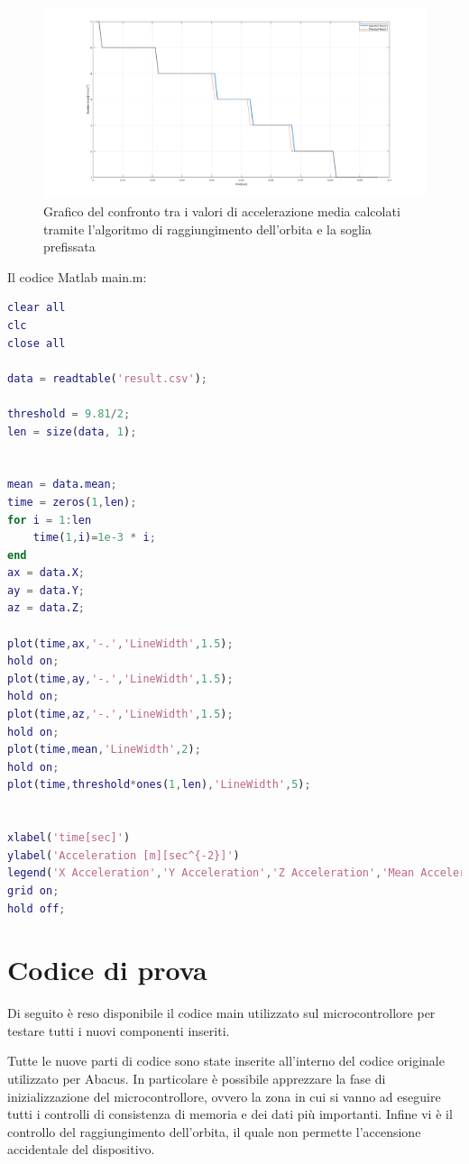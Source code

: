 \documentclass[LaM,binding=0.6cm]{../sapthesis}
\begin{document}
\begin{itemize}
    \begin{figure}[htbp]
    \centerline{\includegraphics[scale=0.4]{examples/CompareAlgorithResult.png}}
    \caption{Grafico del confronto tra i valori di accelerazione media calcolati tramite l'algoritmo di raggiungimento dell'orbita e la soglia prefissata}
    \label{fig}
    \end{figure}
\end{itemize}


\newpage
Il codice Matlab main.m:
\newline
\begin{lstlisting}[language=Matlab]
clear all
clc
close all

data = readtable('result.csv');

threshold = 9.81/2;
len = size(data, 1);


mean = data.mean;
time = zeros(1,len);
for i = 1:len
    time(1,i)=1e-3 * i;
end
ax = data.X;
ay = data.Y;
az = data.Z;

plot(time,ax,'-.','LineWidth',1.5);
hold on;
plot(time,ay,'-.','LineWidth',1.5);
hold on;
plot(time,az,'-.','LineWidth',1.5);
hold on;
plot(time,mean,'LineWidth',2);
hold on;
plot(time,threshold*ones(1,len),'LineWidth',5);


xlabel('time[sec]')
ylabel('Acceleration [m][sec^{-2}]')
legend('X Acceleration','Y Acceleration','Z Acceleration','Mean Acceleration','Acceleration Threshold')
grid on;
hold off;
\end{lstlisting}
\newpage
\section{Codice di prova}
Di seguito è reso disponibile il codice main utilizzato sul microcontrollore per testare tutti i nuovi componenti inseriti. 

Tutte le nuove parti di codice sono state inserite all'interno del codice originale utilizzato per Abacus. In particolare è possibile apprezzare la fase di inizializzazione del microcontrollore, ovvero la zona in cui si vanno ad eseguire tutti i controlli di consistenza di memoria e dei dati più importanti. Infine vi è il controllo del raggiungimento dell'orbita, il quale non permette l'accensione accidentale del dispositivo.
\end{document}
